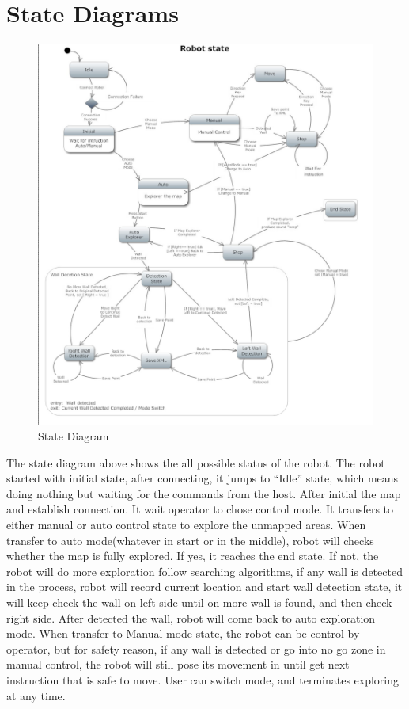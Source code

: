 \documentclass[11pt, a4paper]{report}
\begin{document}
\section{State Diagrams}
\begin{figure}[h]
  \centering
    \includegraphics[width=16cm]{SEP_13_RobotStateDiagram.jpg}
  \caption{State Diagram}
\end{figure}
The state diagram above shows the all possible status of the robot. The robot started with initial state, after connecting, it jumps to ``Idle'' state, which means doing nothing but waiting for the commands from the host. After initial the map and establish connection. It wait operator to chose control mode. It transfers to either manual or auto control state to explore the unmapped areas. When transfer to auto mode(whatever in start or in the middle), robot will checks whether the map is fully explored. If yes, it reaches the end state. If not, the robot will do more exploration follow searching algorithms, if any wall is detected in the process, robot will record current location and start wall detection state, it will keep check the wall on left side until on more wall is found, and then check right side. After detected the wall, robot will come back to auto exploration mode. When transfer to Manual mode state, the robot can be control by operator, but for safety reason, if any wall is detected or go into no go zone in manual control, the robot will still pose its movement in until get next instruction that is safe to move. User can switch mode, and terminates exploring at any time.
\newpage
\end{document}
